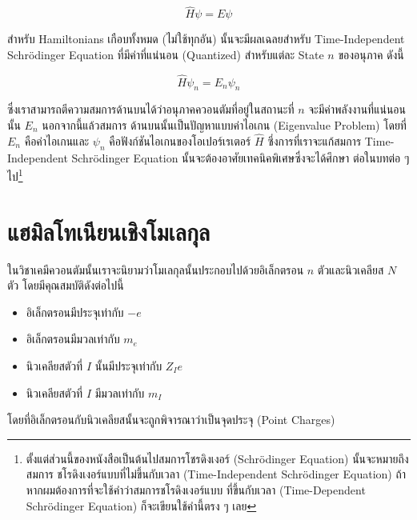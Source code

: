 \begin{equation}
  \label{eq:time_independent_schrodinger}
  \hat{H} \psi = E \psi
\end{equation}

สำหรับ Hamiltonians เกือบทั้งหมด (ไม่ใช้ทุกอัน) นั้นจะมีผลเฉลยสำหรับ Time-Independent Schr\"{o}dinger Equation ที่มีค่าที่แน่นอน
(Quantized) สำหรับแต่ละ State $n$ ของอนุภาค ดังนี้

\begin{equation}
  \hat{H} \psi_n = E_n \psi_n
\end{equation}

\noindent ซึ่งเราสามารถตีความสมการด้านบนได้ว่าอนุภาคควอนตัมที่อยู่ในสถานะที่ $n$ จะมีค่าพลังงานที่แน่นอนนั้น $E_n$ นอกจากนี้แล้วสมการ%
ด้านบนนั้นเป็นปัญหาแบบค่าไอเกน (Eigenvalue Problem) โดยที่ $E_n$ คือค่าไอเกนและ $\psi_n$ คือฟังก์ชันไอเกนของโอเปอร์เรเตอร์
$\hat{H}$ ซึ่งการที่เราจะแก้สมการ Time-Independent Schr\"{o}dinger Equation นั้นจะต้องอาศัยเทคนิคพิเศษซึ่งจะได้ศึกษา%
ต่อในบทต่อ ๆ ไป\footnote{ตั้งแต่ส่วนนี้ของหนังสือเป็นต้นไปสมการโชรดิงเงอร์ (Schr\"{o}dinger Equation) นั้นจะหมายถึงสมการ%
ชโรดิงเงอร์แบบที่ไม่ขึ้นกับเวลา (Time-Independent Schr\"{o}dinger Equation) ถ้าหากผมต้องการที่จะใช้คำว่าสมการชโรดิงเงอร์แบบ%
ที่ขึ้นกับเวลา (Time-Dependent Schr\"{o}dinger Equation) ก็จะเขียนใช้คำนี้ตรง ๆ เลย}

\section{แฮมิลโทเนียนเชิงโมเลกุล}

ในวิชาเคมีควอนตัมนั้นเราจะนิยามว่าโมเลกุลนั้นประกอบไปด้วยอิเล็กตรอน $n$ ตัวและนิวเคลียส $N$ ตัว โดยมีคุณสมบัติดังต่อไปนี้

\begin{itemize}[topsep=0pt,noitemsep]
  \setlength\itemsep{1em}
  \item อิเล็กตรอนมีประจุเท่ากับ $-e$

  \item อิเล็กตรอนมีมวลเท่ากับ $m_e$

  \item นิวเคลียสตัวที่ $I$ นั้นมีประจุเท่ากับ $Z_I e$

  \item นิวเคลียสตัวที่ $I$ มีมวลเท่ากับ $m_I$
\end{itemize}

\noindent โดยที่อิเล็กตรอนกับนิวเคลียสนั้นจะถูกพิจารณาว่าเป็นจุดประจุ (Point Charges)

